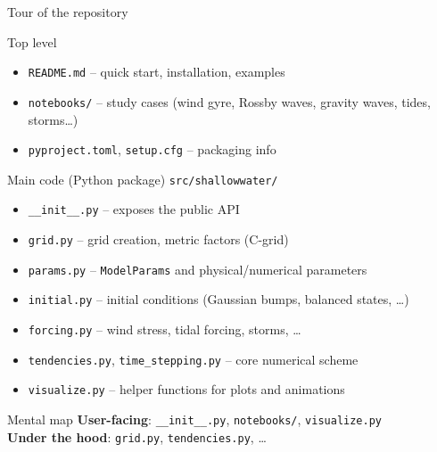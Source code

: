 \documentclass[]{beamer}
\begin{document}
\begin{frame}[shrink=8]{Tour of the repository}
  \begin{block}{Top level}
    \begin{itemize}
      \item \texttt{README.md} -- quick start, installation, examples
      \item \texttt{notebooks/} -- study cases (wind gyre, Rossby waves, gravity waves, tides, storms\dots)
      \item \texttt{pyproject.toml}, \texttt{setup.cfg} -- packaging info
    \end{itemize}
  \end{block}
  \begin{block}{Main code (Python package)}
    \texttt{src/shallowwater/}
    \begin{itemize}
      \item \texttt{\_\_init\_\_.py} -- exposes the public API
      \item \texttt{grid.py} -- grid creation, metric factors (C-grid)
      \item \texttt{params.py} -- \texttt{ModelParams} and physical/numerical parameters
      \item \texttt{initial.py} -- initial conditions (Gaussian bumps, balanced states, \dots)
      \item \texttt{forcing.py} -- wind stress, tidal forcing, storms, \dots
      \item \texttt{tendencies.py}, \texttt{time\_stepping.py} -- core numerical scheme
      \item \texttt{visualize.py} -- helper functions for plots and animations
    \end{itemize}
  \end{block}
  \begin{block}{Mental map}
    \textbf{User-facing}: \texttt{\_\_init\_\_.py}, \texttt{notebooks/}, \texttt{visualize.py}\\
    \textbf{Under the hood}: \texttt{grid.py}, \texttt{tendencies.py}, \dots
  \end{block}
\end{frame}
\end{document}
